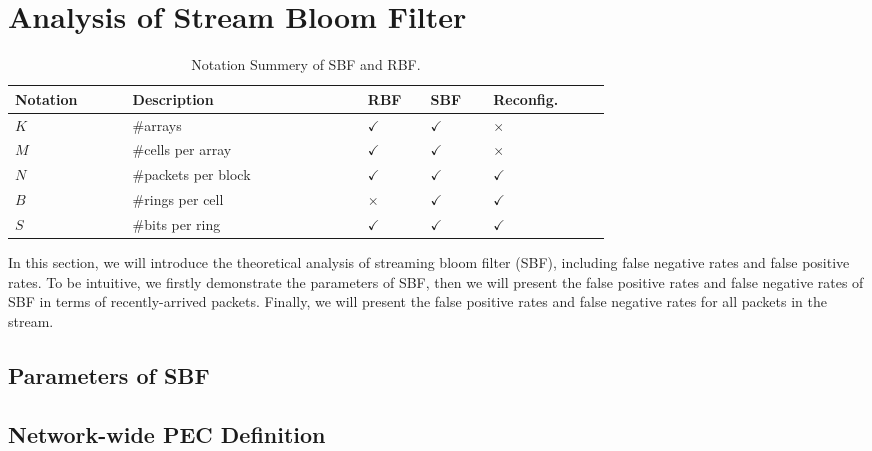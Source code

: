 \documentclass[sigconf]{acmart}
\begin{document}



\section{Analysis of Stream Bloom Filter}

\newcommand{\Y}{{\color{red}$\checkmark$}}
\newcommand{\N}{{\color{green}\textbf{$\times$}}}

\begin{table}
\small
\centering
\caption{Notation Summery of SBF and RBF.}
\label{tbl:primitive-actions}
\begin{tabular}{|m{0.15\linewidth}|m{0.30\linewidth}|m{0.08\linewidth}|m{0.08\linewidth}|m{0.15\linewidth}|}

\hline
\textbf{Notation} & \textbf{Description} & \textbf{RBF} & \textbf{SBF} & \textbf{Reconfig.} \\
\hline
\hline

$K$ & \#arrays & \Y & \Y & \N \\
\hline
$M$ & \#cells per array & \Y & \Y & \N \\ 
\hline
$N$ & \#packets per block & \Y & \Y & \Y \\
\hline
$B$ & \#rings per cell & \N & \Y & \Y \\ 
\hline
$S$ & \#bits per ring & \Y & \Y & \Y \\
\hline



\end{tabular}

\end{table}


In this section, we will introduce the theoretical analysis of streaming bloom filter (SBF), including false negative rates and false positive rates. To be intuitive, we firstly demonstrate the parameters of SBF, then we will present the false positive rates and false negative rates of SBF in terms of recently-arrived packets. Finally, we will present the false positive rates and false negative rates for all packets in the stream.

\subsection{Parameters of SBF}

\subsection{Network-wide PEC Definition}

\subsection{}






\end{document}
